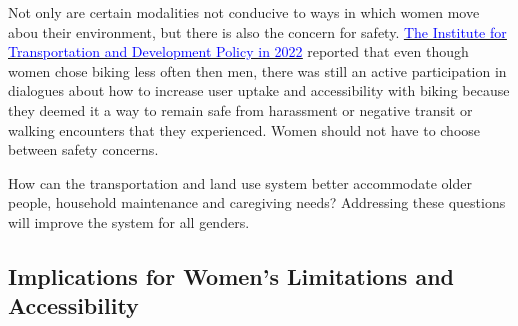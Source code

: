 \documentclass[
  12pt,
]{article}
\begin{document}
\begin{flushleft}
Not only are certain modalities not conducive to ways in which women move abou their environment, but there is also the concern for safety. \href{https://www.itdp.org/2022/07/06/cyclings-gender-gap/}{\underline{\textcolor{blue}{The Institute for Transportation and Development Policy in 2022}}} reported that even though women chose biking less often then men, there was still an active participation in dialogues about how to increase user uptake and accessibility with biking because they deemed it a way to remain safe from harassment or negative transit or walking encounters that they experienced. Women should not have to choose between safety concerns.

How can the transportation and land use system better accommodate older people, household maintenance and caregiving needs? Addressing these questions will improve the system for all genders.
\end{flushleft}

\newpage
\setlength{\headheight}{10pt}
\setlength{\textheight}{665pt}
\fancyhead[L]{}

\hypertarget{implications-for-womens-limitations-and-accessibility}{%
\subsection{Implications for Women's Limitations and
Accessibility}\label{implications-for-womens-limitations-and-accessibility}}
\end{document}
